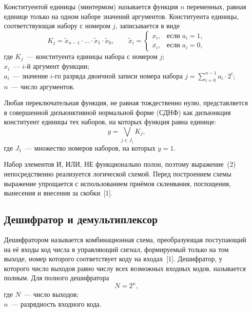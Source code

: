 \documentclass[14pt,a4paper]{extarticle}
\newcommand{\inv}[1]{\overline{#1}}
\begin{document}
Конституентой единицы (минтермом) называется функция $n$ переменных, равная единице только на одном наборе значений аргументов. Конституента единицы, соответствующая набору с номером $j$, записывается в виде
\begin{equation}
K_j = \tilde{x}_{n-1} \cdot \ldots \cdot \tilde{x}_1 \cdot \tilde{x}_0, \qquad
\tilde{x}_i =
\begin{cases}
x_i, & \text{если } a_i = 1,\\
\inv{x_i}, & \text{если } a_i = 0,
\end{cases}
\end{equation}
\noindent где $K_j$~--- конституента единицы набора с номером $j$;\\
$x_i$~--- $i$-й аргумент функции;\\
$a_i$~--- значение $i$-го разряда двоичной записи номера набора $j = \sum_{i=0}^{n-1} a_i \cdot 2^i$;\\
$n$~--- число аргументов.

Любая переключательная функция, не равная тождественно нулю, представляется в совершенной дизъюнктивной нормальной форме (СДНФ) как дизъюнкция конституент единицы тех наборов, на которых функция равна единице:
\begin{equation}
y = \bigvee_{j \in J_1} K_j,
\end{equation}
\noindent где $J_1$~--- множество номеров наборов, на которых $y = 1$.

Набор элементов И, ИЛИ, НЕ функционально полон, поэтому выражение~(2) непосредственно реализуется логической схемой. Перед построением схемы выражение упрощается с использованием приёмов склеивания, поглощения, вынесения и внесения за скобки~[1].

\subsection{Дешифратор и демультиплексор}

Дешифратором называется комбинационная схема, преобразующая поступающий на её входы код числа в управляющий сигнал, формируемый только на том выходе, номер которого соответствует коду на входах~[1]. Дешифратор, у которого число выходов равно числу всех возможных входных кодов, называется полным. Для полного дешифратора
\begin{equation}
N = 2^n,
\end{equation}
\noindent где $N$~--- число выходов;\\
$n$~--- разрядность входного кода.
\end{document}
